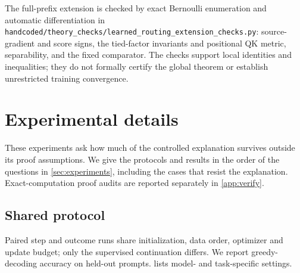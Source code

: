 The full-prefix extension is checked by exact Bernoulli enumeration and automatic
differentiation in
\nolinkurl{handcoded/theory_checks/learned_routing_extension_checks.py}:
source-gradient and score signs, the tied-factor invariants and positional QK
metric, separability, and the fixed comparator. The checks support local
identities and inequalities; they do not formally certify the global theorem
or establish unrestricted training convergence.

\section{Experimental details}
\label{app:experiments}
\label{app:experimental-details}
These experiments ask how much of the controlled explanation survives outside its proof assumptions. We give the protocols and
results in the order of the questions in \cref{sec:experiments}, including the cases that resist the explanation. Exact-computation
proof audits are reported separately in \cref{app:verify}.

\subsection{Shared protocol}
\label{app:letter-protocol}
Paired step and outcome runs share initialization, data order, optimizer and update budget; only the supervised continuation differs.
We report greedy-decoding accuracy on held-out prompts.  lists model- and task-specific settings.

\begin{table}[H]
\centering\small
{}
\caption{\textbf{Shared experimental settings.} Task-specific exceptions are stated in the corresponding subsections.}
\label{tab:protocol}
\end{table}

